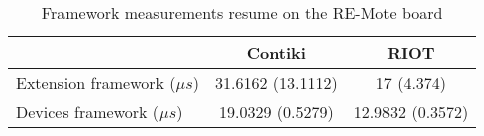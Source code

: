 \begin{table}[!ht]
  \centering
  \begin{tabular}{l|c|c}
                      & Contiki           & RIOT             \\ \hline
  Extension framework ($\mu s$) & 31.6162 (13.1112) & 17 (4.374)       \\
  Devices framework ($\mu s$)   & 19.0329 (0.5279)  & 12.9832 (0.3572)
  \end{tabular}
  \caption{Framework measurements resume on the RE-Mote board}
  \label{tab:framework-measurements-resume-remote}
  \end{table}
